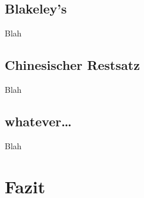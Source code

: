 \documentclass[12pt, a4paper, oneside, titlepage]{report}
\theoremstyle{definition}
\begin{document}
	\subsection{Blakeley's}
		Blah %
		
	\subsection{Chinesischer Restsatz}
	Blah %
		
	\subsection{whatever\dots}
		Blah %
	
	\section{Fazit}
	
	\cleardoublepage
	\listoffigures
	\begingroup
	\let\clearpage\relax
	
	\endgroup
\end{document}
